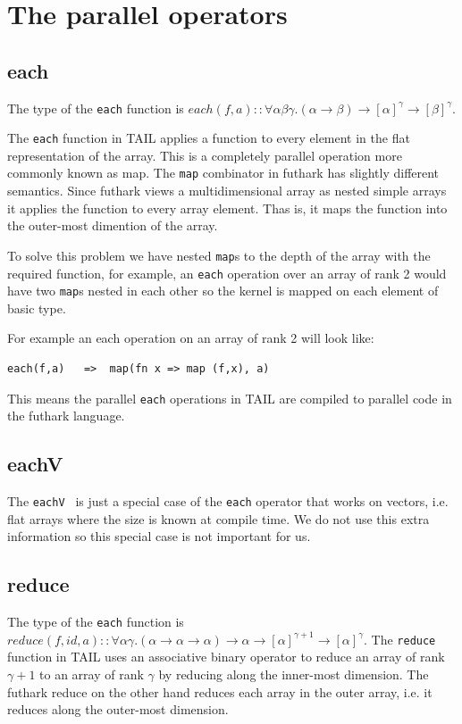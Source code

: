 \documentclass[11pt]{article}
\begin{document}
\section{The parallel operators}

\subsection{each}

The type of the {\tt each} function is $each(f,a) :: \forall\alpha\beta\gamma.(\alpha \to \beta) \to [\alpha]^\gamma \to [\beta]^\gamma$.

The {\tt each} function in TAIL applies a function to every element in the flat representation of the array. This is a completely parallel operation more commonly known as map. The {\tt map} combinator in futhark has slightly different semantics.
Since futhark views a multidimensional array as nested simple arrays it applies the function to every array element.
Thas is, it maps the function into the outer-most dimention of the array.

To solve this problem we have nested {\tt map}s to the depth of the array with the required function, for example, an {\tt each} operation over an array of rank 2 would have two {\tt map}s nested in each other so the kernel is mapped on each element of basic type.

For example an each operation on an array of rank 2 will look like:
\begin{lstlisting}[numbers=none,frame=none]
each(f,a)	=>	map(fn x => map (f,x), a)
\end{lstlisting}

This means the parallel {\tt each} operations in TAIL are compiled to parallel code in the futhark language.

\subsection{eachV}
The {\tt eachV } is just a special case of the {\tt each} operator that works on vectors, i.e. flat arrays where the size
is known at compile time. We do not use this extra information so this special case is not important for us.

\subsection{reduce}
The type of the {\tt each} function is $reduce(f,id,a) :: \forall\alpha\gamma.(\alpha \to \alpha \to \alpha) \to \alpha \to [\alpha]^{\gamma+1} \to [\alpha]^\gamma$.
The {\tt reduce} function in TAIL uses an associative binary operator to reduce an array of rank $\gamma+1$ to an array of rank $\gamma$ by reducing along the inner-most dimension. The futhark reduce on the other hand reduces each array in the outer array, i.e. it reduces along the outer-most dimension. 
\end{document}
